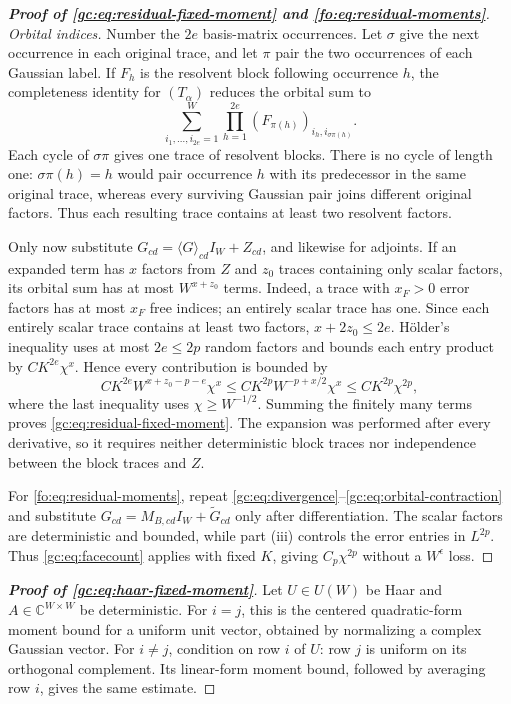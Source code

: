 \documentclass[11pt]{article}
\numberwithin{equation}{section}
\theoremstyle{remark}
\newcommand{\C}{\mathbb C}
\newcommand{\wt}{\widetilde}
\begin{document}
\begin{proof}[\textbf{Proof of \eqref{gc:eq:residual-fixed-moment} and \eqref{fo:eq:residual-moments}}]
\emph{Orbital indices.}
Number the $2e$ basis-matrix occurrences. Let $\sigma$ give the
next occurrence in each original trace, and let $\pi$ pair the two
occurrences of each Gaussian label. If $F_h$ is the resolvent block
following occurrence $h$, the completeness identity for $(T_\alpha)$
reduces the orbital sum to
\begin{equation}\label{gc:eq:orbital-contraction}
 \sum_{i_1,\ldots,i_{2e}=1}^W
       \prod_{h=1}^{2e}(F_{\pi(h)})_{i_h,i_{\sigma\pi(h)}}.
\end{equation}
Each cycle of $\sigma\pi$ gives one trace of resolvent blocks.
There is no cycle of length one: $\sigma\pi(h)=h$ would pair
occurrence $h$ with its predecessor in the same original trace,
whereas every surviving Gaussian pair joins different original factors.
Thus each resulting trace contains at least two resolvent factors.

Only now substitute $G_{cd}=\langle G\rangle_{cd}I_W+Z_{cd}$, and likewise for
adjoints. If an expanded term has $x$ factors from $Z$ and $z_0$
traces containing only scalar factors, its orbital sum has at most
$W^{x+z_0}$ terms. Indeed, a trace with $x_F>0$ error factors has
at most $x_F$ free indices; an entirely scalar trace has one.
Since each entirely scalar trace contains at least two factors,
$x+2z_0\le2e$. H\"older's inequality uses at most $2e\le2p$
random factors and bounds each entry product by
$CK^{2e}\chi^x$. Hence every contribution is bounded by
\begin{equation}\label{gc:eq:facecount}
 CK^{2e}W^{x+z_0-p-e}\chi^x
 \le CK^{2p}W^{-p+x/2}\chi^x
 \le CK^{2p}\chi^{2p},
\end{equation}
where the last inequality uses $\chi\ge W^{-1/2}$.
Summing the finitely many terms proves
\eqref{gc:eq:residual-fixed-moment}. The expansion was performed
after every derivative, so it requires neither deterministic block traces
nor independence between the block traces and $Z$.

For \eqref{fo:eq:residual-moments}, repeat
\eqref{gc:eq:divergence}--\eqref{gc:eq:orbital-contraction} and
substitute $G_{cd}=M_{B,cd}I_W+\wt G_{cd}$ only after differentiation.
The scalar factors are deterministic and bounded, while part (iii)
controls the error entries in $L^{2p}$. Thus \eqref{gc:eq:facecount}
applies with fixed $K$, giving $C_p\chi^{2p}$ without a $W^\epsilon$ loss.
\end{proof}

\begin{proof}[\textbf{Proof of \eqref{gc:eq:haar-fixed-moment}}]
Let $U\in U(W)$ be Haar and $A\in\C^{W\times W}$ be deterministic.
For $i=j$, this is the centered quadratic-form moment bound for a
uniform unit vector, obtained by normalizing a complex Gaussian vector.
For $i\ne j$, condition on row $i$ of $U$: row $j$ is uniform on
its orthogonal complement. Its linear-form moment bound, followed
by averaging row $i$, gives the same estimate.
\end{proof}
\end{document}

